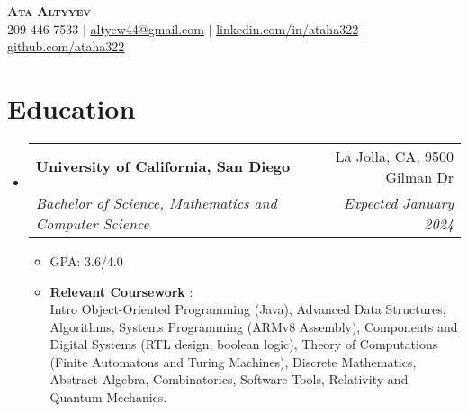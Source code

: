 \documentclass[letterpaper,11pt]{article}
\makeatletter
\newcommand{\resumeItem}[1]{
  \item\small{
    {#1 \vspace{-2pt}}
  }
}
\newcommand{\resumeSubheading}[4]{
  \vspace{-2pt}\item
    \begin{tabular*}{0.97\textwidth}[t]{l@{\extracolsep{\fill}}r}
      \textbf{#1} & #2 \\
      \textit{\small#3} & \textit{\small #4} \\
    \end{tabular*}\vspace{-7pt}
}
\newcommand{\resumeSubHeadingListStart}{\begin{itemize}[leftmargin=0.15in, label={}]}
\newcommand{\resumeSubHeadingListEnd}{\end{itemize}}
\newcommand{\resumeItemListStart}{\begin{itemize}}
\newcommand{\resumeItemListEnd}{\end{itemize}\vspace{-5pt}}
\makeatother
\begin{document}


\begin{center}
    \textbf{\Huge \scshape Ata Altyyev} \\ \vspace{1pt}
    \small 209-446-7533 $|$ \href{mailto:altyew44@gmail.com}{\underline{altyew44@gmail.com}} $|$ 
    \href{https://linkedin.com/in/ataha322}{\underline{linkedin.com/in/ataha322}} $|$
    \href{https://github.com/ataha322}{\underline{github.com/ataha322}}
\end{center}


\section{Education}
  \resumeSubHeadingListStart
    \resumeSubheading
      {University of California, San Diego}{La Jolla, CA, 9500 Gilman Dr}
      {Bachelor of Science, Mathematics and Computer Science}{Expected January 2024}
          \resumeItemListStart
            \resumeItem{GPA: 3.6/4.0}
            \resumeItem{\textbf{Relevant Coursework}}:\\
            Intro Object-Oriented Programming (Java), Advanced Data Structures, Algorithms, Systems Programming (ARMv8 Assembly), Components and Digital Systems (RTL design, boolean logic), Theory of Computations (Finite Automatons and Turing Machines), Discrete Mathematics, Abstract Algebra, Combinatorics, Software Tools, Relativity and Quantum Mechanics.
            
        \resumeItemListEnd

  \resumeSubHeadingListEnd


      
      
\end{document}
